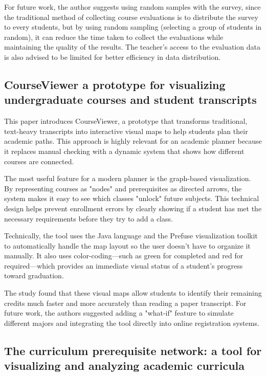For future work, the author suggests using random samples with the survey, since the traditional method of collecting course evaluations is to distribute the survey to every students, but by using random sampling (selecting a group of students in random), it can reduce the time taken to collect the evaluations while maintaining the quality of the results. The teacher's access to the evaluation data is also advised to be limited for better efficiency in data distribution. 


\subsection{CourseViewer a prototype for visualizing undergraduate courses and student transcripts \cite {paper_15}}

This paper introduces CourseViewer, a prototype that transforms traditional, text-heavy transcripts into interactive visual maps to help students plan their academic paths. This approach is highly relevant for an academic planner because it replaces manual checking with a dynamic system that shows how different courses are connected.

The most useful feature for a modern planner is the graph-based visualization. By representing courses as "nodes" and prerequisites as directed arrows, the system makes it easy to see which classes "unlock" future subjects. This technical design helps prevent enrollment errors by clearly showing if a student has met the necessary requirements before they try to add a class.

Technically, the tool uses the Java language and the Prefuse visualization toolkit to automatically handle the map layout so the user doesn't have to organize it manually. It also uses color-coding—such as green for completed and red for required—which provides an immediate visual status of a student's progress toward graduation.

The study found that these visual maps allow students to identify their remaining credits much faster and more accurately than reading a paper transcript. For future work, the authors suggested adding a "what-if" feature to simulate different majors and integrating the tool directly into online registration systems.


\subsection{The curriculum prerequisite network: a tool for visualizing and analyzing academic curricula \cite{paper_13}}

